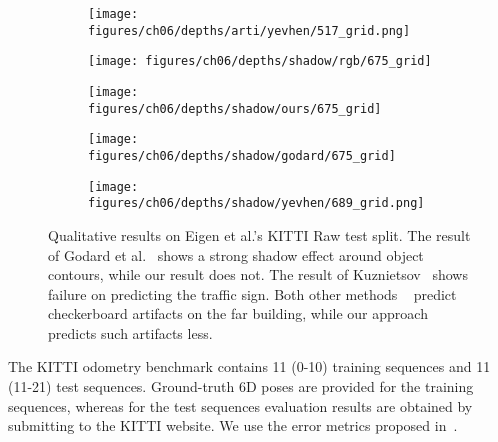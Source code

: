 \documentclass[runningheads]{llncs}
\begin{document}
\begin{figure}[tb]
\begin{subfigure}[t]{.24\textwidth}
		\texttt{[image: figures/ch06/depths/arti/yevhen/517\_grid.png]}
	\end{subfigure}
	\begin{subfigure}[t]{.24\textwidth}
		\centering
		\texttt{[image: figures/ch06/depths/shadow/rgb/675\_grid]}
	\end{subfigure}
	\begin{subfigure}[t]{.24\textwidth}
		\centering
		\texttt{[image: figures/ch06/depths/shadow/ours/675\_grid]}
	\end{subfigure}
	\begin{subfigure}[t]{.24\textwidth}
		\centering
		\texttt{[image: figures/ch06/depths/shadow/godard/675\_grid]}
	\end{subfigure}
	\begin{subfigure}[t]{.24\textwidth}
		\centering
		\texttt{[image: figures/ch06/depths/shadow/yevhen/689\_grid.png]}
	\end{subfigure}
	\caption{Qualitative results on Eigen et al.'s KITTI Raw test split. The result of Godard et 
		al.~\cite{godard2016unsupervised} shows a strong shadow effect around 
		object 
		contours, while our result does not. The result of 
		Kuznietsov~\cite{kuznietsov2017semi} shows failure on predicting the 
		traffic sign. Both other methods ~\cite{godard2016unsupervised,kuznietsov2017semi} 
		predict 
		checkerboard artifacts on the far 
		building, while our approach predicts such artifacts less.}
	\label{fig:shadow}
\end{figure}%
The KITTI odometry benchmark contains 11 (0-10)
training sequences and 11 (11-21) test sequences. Ground-truth 6D poses are 
provided for the training sequences, whereas for the test sequences evaluation results
are obtained by submitting to the KITTI website. 
We use the error metrics proposed in~\cite{Geiger2013IJRR}.
\end{document}
